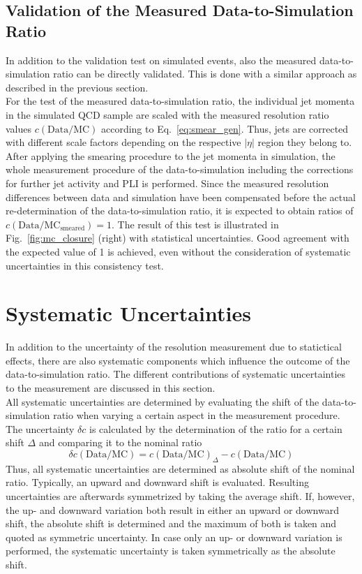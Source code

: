\subsection{Validation of the Measured Data-to-Simulation Ratio}
\label{sec:jer_validation_ratio}
In addition to the validation test on simulated events, also the measured data-to-simulation ratio can be directly validated. This is done with a similar approach as described in the previous section.\\
For the test of the measured data-to-simulation ratio, the individual jet momenta in the simulated \pythia QCD sample are scaled with the measured resolution ratio values $c{(\mathrm{Data}/\mathrm{MC})}$ according to Eq.~\ref{eq:smear_gen}. Thus, jets are corrected with different scale factors depending on the respective $|\eta|$ region they belong to. After applying the smearing procedure to the jet momenta in simulation, the whole measurement procedure of the data-to-simulation including the corrections for further jet activity and PLI is performed. Since the measured resolution differences between data and simulation have been compensated before the actual re-determination of the data-to-simulation ratio, it is expected to obtain ratios of $c\mathrm{(Data/MC_{smeared})} = 1$. The result of this test is illustrated in Fig.~\ref{fig:mc_closure} (right) with statistical uncertainties. Good agreement with the expected value of 1 is achieved, even without the consideration of systematic uncertainties in this consistency test.

\section{Systematic Uncertainties}
\label{sec:jer_syst_unc}
In addition to the uncertainty of the resolution measurement due to statictical effects, there are also systematic components which influence the outcome of the data-to-simulation ratio. The different contributions of systematic uncertainties to the measurement are discussed in this section.\\
All systematic uncertainties are determined by evaluating the shift of the data-to-simulation ratio when varying a certain aspect in the measurement procedure. The uncertainty $\delta c$ is calculated by the determination of the ratio for a certain shift $\Delta$ and comparing it to the nominal ratio 
 \begin{equation}
  \delta c{\mathrm{(Data/MC)}} = c{\mathrm{(Data/MC)}_{\Delta}} - c\mathrm{(Data/MC)}
 \end{equation} 
Thus, all systematic uncertainties are determined as absolute shift of the nominal ratio. Typically, an upward and downward shift is evaluated. Resulting uncertainties are afterwards symmetrized by taking the average shift. If, however, the up- and downward variation both result in either an upward or downward shift, the absolute shift is determined and the maximum of both is taken and quoted as symmetric uncertainty. In case only an up- or downward variation is performed, the systematic uncertainty is taken symmetrically as the absolute shift.   

